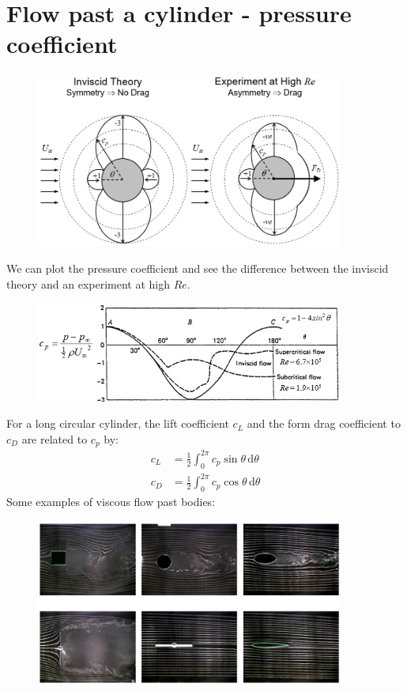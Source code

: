 \documentclass[class=report, crop=false, 12pt,a4paper]{standalone}
\begin{document}
\section{Flow past a cylinder - pressure coefficient}
\begin{figure}[H]
  \centering
  \includegraphics[width = 0.9\textwidth]{../img/diagram29.png}
\end{figure}
We can plot the pressure coefficient and see the difference between the inviscid theory and an experiment at high $Re$.
\begin{figure}[H]
  \centering
  \includegraphics[width = 0.9\textwidth]{../img/diagram30.png}
\end{figure}
For a long circular cylinder, the lift coefficient $c_L$ and the form drag coefficient to $c_D$ are related to $c_p$ by:
\begin{align}
  c_L &= \frac{1}{2} \int_{0}^{2\pi} c_p \sin{\theta} \,\mathrm{d}\theta \\
  c_D &= \frac{1}{2} \int_{0}^{2\pi} c_p \cos{\theta} \,\mathrm{d}\theta 
\end{align}
Some examples of viscous flow past bodies:
\begin{figure}[H]
  \centering
  \includegraphics[width = 0.9\textwidth]{../img/diagram31.png}
\end{figure}
\end{document}

